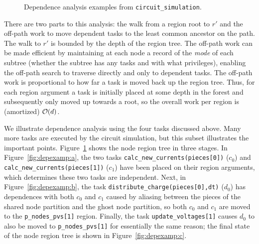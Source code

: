 \begin{figure}
{\label{fig:depexamp:c}
}
\label{fig:depexamp}
\caption{Dependence analysis examples from {\tt circuit\_simulation}.}
\end{figure}

There are two parts to this analysis:
the walk from a region root to $r'$ and the off-path work
to move dependent tasks to the least common ancestor on the path.
The walk to $r'$ is bounded by the depth of the region tree.
The off-path work can be made efficient by maintaining at each node a
record of the {\em mode} of each subtree (whether the subtree has any tasks and with what privileges),
enabling the off-path search to traverse directly and only to
dependent tasks.  The off-path work is proportional to how far a task
is moved back up the region tree.  Thus, for each region argument a
task is initially placed at some depth in the forest and subsequently
only moved up towards a root, so the overall work per region is (amortized)
${\cal O}(d)$.  

We illustrate dependence analysis using the four tasks discussed
above.  Many more tasks are executed by the circuit simulation,
but this subset illustrates the important
points. Figure~\ref{fig:depexamp} shows the node region tree in three
stages.  In Figure~\ref{fig:depexamp:a}, the two tasks
{\tt calc\_new\_currents(pieces[0])} ($c_0$) and {\tt
    calc\_new\_currents(pieces[1])} ($c_1$) have been placed on their region arguments,
  which determines these two tasks are independent.
Next, in Figure~\ref{fig:depexamp:b}, the task {\tt distribute\_charge(pieces[0],dt)} ($d_0$)
has dependences with both $c_0$ and $c_1$ caused by aliasing between the pieces of the
shared node partition and the ghost node partition, so both $c_0$ and $c_1$ are moved to
the {\tt p\_nodes\_pvs[1]} region.  Finally, the task {\tt update\_voltages[1]} causes
$d_0$ to also be moved to {\tt p\_nodes\_pvs[1]} for essentially the same reason; the final
state of the node region tree is shown in Figure~\ref{fig:depexamp:c}.


